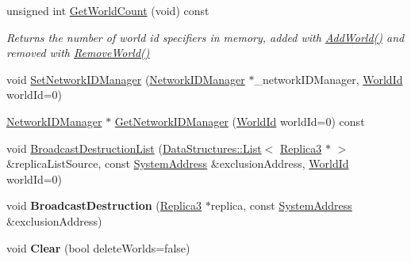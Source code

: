 \begin{DoxyCompactItemize}
unsigned int \hyperlink{class_rak_net_1_1_replica_manager3_a891d12ab7939014c08dd9da67981fab1}{Get\-World\-Count} (void) const 
\begin{DoxyCompactList}\small\item\em Returns the number of world id specifiers in memory, added with \hyperlink{class_rak_net_1_1_replica_manager3_aa0c70560e7dd9bda8b50ff3909f78248}{Add\-World()} and removed with \hyperlink{class_rak_net_1_1_replica_manager3_a18b55ef2c0606b05896e2b4a5103ab21}{Remove\-World()} \end{DoxyCompactList}\item 
void \hyperlink{class_rak_net_1_1_replica_manager3_a916816210240e1f1d38478cea311999e}{Set\-Network\-I\-D\-Manager} (\hyperlink{class_rak_net_1_1_network_i_d_manager}{Network\-I\-D\-Manager} $\ast$\-\_\-network\-I\-D\-Manager, \hyperlink{group___r_e_p_l_i_c_a___m_a_n_a_g_e_r___g_r_o_u_p3_ga44b59af8e882248f61aa41d8ace38bf7}{World\-Id} world\-Id=0)
\item 
\hyperlink{class_rak_net_1_1_network_i_d_manager}{Network\-I\-D\-Manager} $\ast$ \hyperlink{class_rak_net_1_1_replica_manager3_a55a26c19127b186be5653022ed45a514}{Get\-Network\-I\-D\-Manager} (\hyperlink{group___r_e_p_l_i_c_a___m_a_n_a_g_e_r___g_r_o_u_p3_ga44b59af8e882248f61aa41d8ace38bf7}{World\-Id} world\-Id=0) const 
\item 
void \hyperlink{class_rak_net_1_1_replica_manager3_a4df5f5e2e47b69b1abe22ba8b445e385}{Broadcast\-Destruction\-List} (\hyperlink{class_data_structures_1_1_list}{Data\-Structures\-::\-List}$<$ \hyperlink{class_rak_net_1_1_replica3}{Replica3} $\ast$ $>$ \&replica\-List\-Source, const \hyperlink{struct_rak_net_1_1_system_address}{System\-Address} \&exclusion\-Address, \hyperlink{group___r_e_p_l_i_c_a___m_a_n_a_g_e_r___g_r_o_u_p3_ga44b59af8e882248f61aa41d8ace38bf7}{World\-Id} world\-Id=0)
\item 
\hypertarget{class_rak_net_1_1_replica_manager3_adcd2e6e092e28326e79f67a99eb689b8}{void {\bfseries Broadcast\-Destruction} (\hyperlink{class_rak_net_1_1_replica3}{Replica3} $\ast$replica, const \hyperlink{struct_rak_net_1_1_system_address}{System\-Address} \&exclusion\-Address)}\label{class_rak_net_1_1_replica_manager3_adcd2e6e092e28326e79f67a99eb689b8}

\item 
\hypertarget{class_rak_net_1_1_replica_manager3_a4d832ba258adb139dc7440d0f80ee252}{void {\bfseries Clear} (bool delete\-Worlds=false)}\label{class_rak_net_1_1_replica_manager3_a4d832ba258adb139dc7440d0f80ee252}


\end{DoxyCompactItemize}
